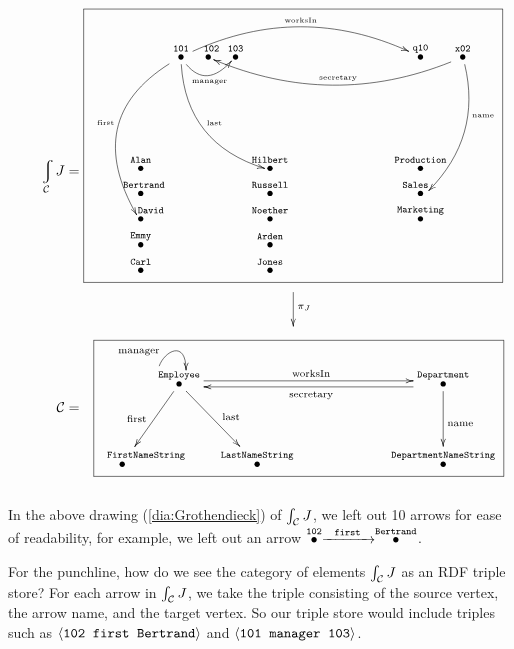 \documentclass[CT4S-EN-RU]{subfiles}
\begin{document}
\begin{applicationENG}
\begin{align}\label{dia:Grothendieck}
\hspace{0in}\varint_\mcC J=\parbox{3.9in}{
\fbox{
\xymatrix@=.1pt{
&\LTO{101}\ar@/_2.5pc/[ddddl]+<-3pt,3pt>_{\tin{first}}\ar@/_1.5pc/[ddrrr]+<-4pt,0pt>^{\tin{last}}\ar@/_1pc/[rr]+<-3pt,-3pt>_-{\tin{manager}}\ar@/^1.8pc/[rrrrrr]^{\tin{worksIn}}&\LTO{\;\;102}&\LTO{103}&&&&\LTO{q10}&\LTO{x02}\ar@/^1.6pc/[llllll]+<4pt,-2pt>_{\tin{secretary}}\ar@/^1.2pc/[lddd]+<6pt,2pt>^(.4){\tin{name}}\\\parbox{.1in}{~\\\vspace{.6in}~}\\\LTO{Alan}&&&&\LTO{Hilbert}&\hspace{.4in}&\hspace{.4in}&\LTO{Production}\\\LTO{\;\;Bertrand}&&&&\LTO{Russell}&&&\LTO{\hspace{-.1in}Sales}\\\LTO{\hspace{.2in}David}&&&&\LTO{Noether}&&&\LTO{Marketing}\\\LTO{Emmy}&&&&\LTO{Arden}\\\LTO{Carl}&&&&\LTO{Jones}}}\\
\xymatrix{\hspace{1.6in}&\ar[d]^{\pi_J}\\&~}}\\
\nonumber \mcC=\parbox{3.9in}{\hspace{.1in}\fbox{
			\xymatrix@=9pt{&\LTO{Employee}\ar@<.5ex>[rrrrr]^{\tn{worksIn}}\ar@(l,u)[]+<5pt,10pt>^{\tn{manager}}\ar[dddl]_{\tn{first}}\ar[dddr]^{\tn{last}}&&&\hspace{0in}&&\LTO{Department}\ar@<.5ex>[lllll]^{\tn{secretary}}\ar[ddd]^{\tn{name}}\\\\\\\LTO{\parbox{.3in}{\tt \scriptsize FirstNameString}}&&\LTO{LastNameString}&~&~&~&\LTO{DepartmentNameString}
			}}}
\end{align}~\\

In the above drawing (\ref{dia:Grothendieck}) of $\int_\mathcal{C} J$, we left out 10 arrows for ease of readability, for example, we left out an arrow $\stackrel{\tt{102}}{\bullet}\xrightarrow{\ \ \tt first\ \ }\stackrel{\tt{Bertrand}}{\bullet}$.

For the punchline, how do we see the category of elements $\int_\mathcal{C} J$ as an RDF triple store? For each arrow in $\int_\mathcal{C} J$, we take the triple consisting of the source vertex, the arrow name, and the target vertex. So our triple store would include triples such as $\langle{\tt 102\;\; first\;\; Bertrand}\rangle$ and $\langle{\tt 101\;\; manager\;\; 103}\rangle$.
\end{applicationENG}
\end{document}
